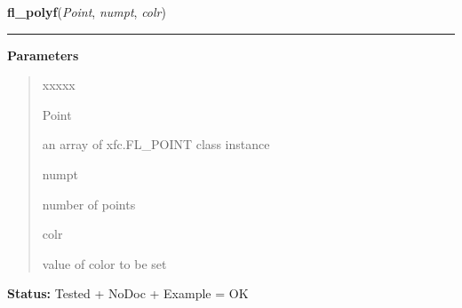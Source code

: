 \hspace{.8\funcindent}\begin{boxedminipage}{\funcwidth}

    \raggedright \textbf{fl\_polyf}(\textit{Point}, \textit{numpt}, \textit{colr})

    \vspace{-1.5ex}

    \rule{\textwidth}{0.5\fboxrule}
\setlength{\parskip}{2ex}
\setlength{\parskip}{1ex}
      \textbf{Parameters}
      \vspace{-1ex}

      \begin{quote}
        \begin{Ventry}{xxxxx}

          \item[Point]

          an array of xfc.FL\_POINT class instance

          \item[numpt]

          number of points

          \item[colr]

          value of color to be set

        \end{Ventry}

      \end{quote}

\textbf{Status:} Tested + NoDoc + Example = OK



    \end{boxedminipage}

    \label{xformslib:library:fl_polyl}

    \vspace{0.5ex}

